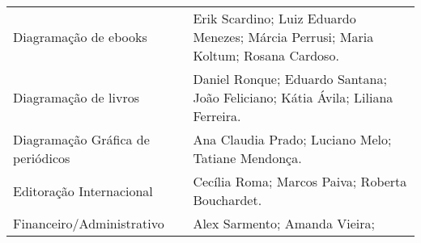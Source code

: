 \documentclass[
]{article}
\begin{document}
\begin{longtable}[]{@{}
  >{\raggedright\arraybackslash}p{}
  >{\raggedright\arraybackslash}p{}@{}}
\begin{minipage}[b]{\linewidth}\raggedright
Diagramação de ebooks
\end{minipage} & \begin{minipage}[b]{\linewidth}\raggedright
Erik Scardino; Luiz Eduardo Menezes; Márcia Perrusi; Maria Koltum; Rosana Cardoso.
\end{minipage} \\
\begin{minipage}[b]{\linewidth}\raggedright
Diagramação de livros
\end{minipage} & \begin{minipage}[b]{\linewidth}\raggedright
Daniel Ronque; Eduardo Santana; João Feliciano; Kátia Ávila; Liliana Ferreira.
\end{minipage} \\
\begin{minipage}[b]{\linewidth}\raggedright
Diagramação Gráfica de periódicos
\end{minipage} & \begin{minipage}[b]{\linewidth}\raggedright
Ana Claudia Prado; Luciano Melo; Tatiane Mendonça.
\end{minipage} \\
\begin{minipage}[b]{\linewidth}\raggedright
Editoração Internacional
\end{minipage} & \begin{minipage}[b]{\linewidth}\raggedright
Cecília Roma; Marcos Paiva; Roberta Bouchardet.
\end{minipage} \\
\begin{minipage}[b]{\linewidth}\raggedright
Financeiro/Administrativo
\end{minipage} & \begin{minipage}[b]{\linewidth}\raggedright
Alex Sarmento; Amanda Vieira;


\end{minipage}
\end{longtable}
\end{document}

